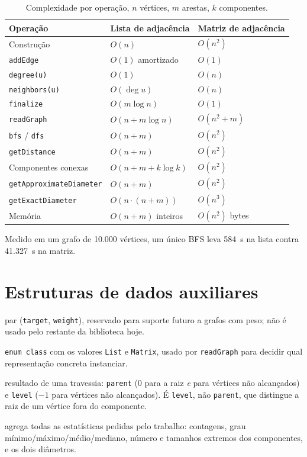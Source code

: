 \documentclass[a4paper,11pt]{article}
\begin{document}
\begin{table}[h]
\centering
\caption{Complexidade por operação, $n$ vértices, $m$ arestas, $k$ componentes.}
\begin{tabular}{@{}lll@{}}
\toprule
\textbf{Operação} & \textbf{Lista de adjacência} & \textbf{Matriz de adjacência} \\
\midrule
Construção            & $O(n)$              & $O(n^2)$ \\
\texttt{addEdge}       & $O(1)$ amortizado   & $O(1)$ \\
\texttt{degree(u)}     & $O(1)$              & $O(n)$ \\
\texttt{neighbors(u)}  & $O(\deg u)$         & $O(n)$ \\
\texttt{finalize}      & $O(m \log n)$       & $O(1)$ \\
\texttt{readGraph}     & $O(n + m \log n)$   & $O(n^2 + m)$ \\
\texttt{bfs} / \texttt{dfs} & $O(n + m)$    & $O(n^2)$ \\
\texttt{getDistance}   & $O(n + m)$          & $O(n^2)$ \\
Componentes conexas    & $O(n + m + k\log k)$ & $O(n^2)$ \\
\texttt{getApproximateDiameter} & $O(n+m)$  & $O(n^2)$ \\
\texttt{getExactDiameter} & $O(n \cdot (n+m))$ & $O(n^3)$ \\
Memória                & $O(n+m)$ inteiros   & $O(n^2)$ bytes \\
\bottomrule
\end{tabular}
\end{table}

Medido em um grafo de 10.000 vértices, um único BFS leva 584~\textmu s na
lista contra 41.327~\textmu s na matriz.

\section{Estruturas de dados auxiliares}

\begin{description}[style=nextline]
\item[\texttt{Edge}] par (\texttt{target}, \texttt{weight}), reservado
para suporte futuro a grafos com peso; não é usado pelo restante da
biblioteca hoje.
\item[\texttt{Representation}] \texttt{enum class} com os valores
\texttt{List} e \texttt{Matrix}, usado por \texttt{readGraph} para
decidir qual representação concreta instanciar.
\item[\texttt{SearchTree}] resultado de uma travessia: \texttt{parent} (0
para a raiz \emph{e} para vértices não alcançados) e \texttt{level}
($-1$ para vértices não alcançados). É \texttt{level}, não
\texttt{parent}, que distingue a raiz de um vértice fora do componente.
\item[\texttt{GraphStats}] agrega todas as estatísticas pedidas pelo
trabalho: contagens, grau mínimo/máximo/médio/mediano, número e tamanhos
extremos dos componentes, e os dois diâmetros.
\end{description}
\end{document}

